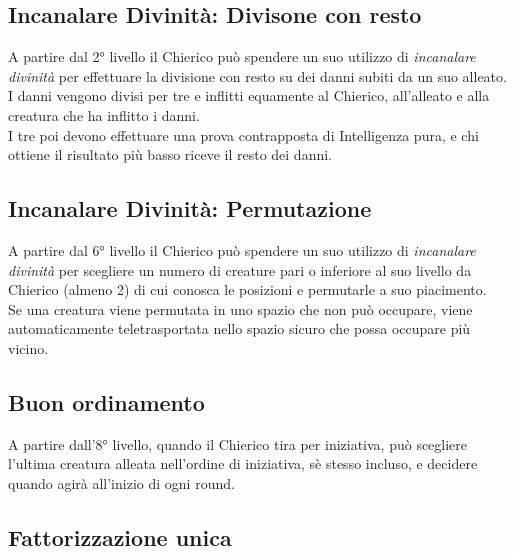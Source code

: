 \subsection{Incanalare Divinità: Divisone con resto}

A partire dal 2° livello il Chierico può spendere un suo utilizzo di \textit{incanalare divinità} per effettuare la divisione con resto su dei danni subiti da un suo alleato. \\ I danni vengono divisi per tre e inflitti equamente al Chierico, all'alleato e alla creatura che ha inflitto i danni. \\ I tre poi devono effettuare una prova contrapposta di Intelligenza pura, e chi ottiene il risultato più basso riceve il resto dei danni.

\subsection{Incanalare Divinità: Permutazione}

A partire dal 6° livello il Chierico può spendere un suo utilizzo di \textit{incanalare divinità} per scegliere un numero di creature pari o inferiore al suo livello da Chierico (almeno 2) di cui conosca le posizioni e permutarle a suo piacimento. \\ Se una creatura viene permutata in uno spazio che non può occupare, viene automaticamente teletrasportata nello spazio sicuro che possa occupare più vicino.

\subsection{Buon ordinamento}

A partire dall'8° livello, quando il Chierico tira per iniziativa, può scegliere l'ultima creatura alleata nell'ordine di iniziativa, sè stesso incluso, e decidere quando agirà all'inizio di ogni round.

\subsection{Fattorizzazione unica}

